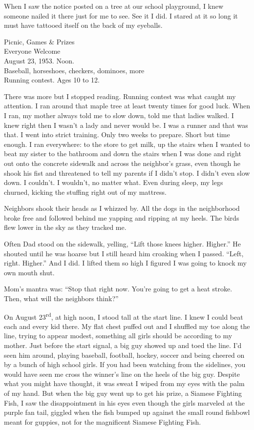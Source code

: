 \documentclass[twoside,10pt]{book}
\begin{document}
When I saw the notice posted on a tree at our school playground, I knew
someone nailed it there just for me to see. See it I did. I stared at it
so long it must have tattooed itself on the back of my eyeballs.

Picnic, Games \& Prizes\\
Everyone Welcome\\
August 23, 1953. Noon.\\
Baseball, horseshoes, checkers, dominoes, more\\
Running contest. Ages 10 to 12.

There was more but I stopped reading. Running contest was what caught my
attention. I ran around that maple tree at least twenty times for good
luck. When I ran, my mother always told me to slow down, told me that
ladies walked. I knew right then I wasn't a lady and never would be. I
was a runner and that was that. I went into strict training. Only two
weeks to prepare. Short but time enough. I ran everywhere: to the store
to get milk, up the stairs when I wanted to beat my sister to the
bathroom and down the stairs when I was done and right out onto the
concrete sidewalk and across the neighbor's grass, even though he shook
his fist and threatened to tell my parents if I didn't stop. I didn't
even slow down. I couldn't. I wouldn't, no matter what. Even during
sleep, my legs churned, kicking the stuffing right out of my mattress.

Neighbors shook their heads as I whizzed by. All the dogs in the
neighborhood broke free and followed behind me yapping and ripping at my
heels. The birds flew lower in the sky as they tracked me.

Often Dad stood on the sidewalk, yelling, ``Lift those knees higher.
Higher.'' He shouted until he was hoarse but I still heard him croaking
when I passed. ``Left, right. Higher.'' And I did. I lifted them so high
I figured I was going to knock my own mouth shut.

Mom's mantra was: ``Stop that right now. You're going to get a heat
stroke. Then, what will the neighbors think?''

On August 23\textsuperscript{rd}, at high noon, I stood tall at the
start line. I knew I could beat each and every kid there. My flat chest
puffed out and I shuffled my toe along the line, trying to appear
modest, some­thing all girls should be according to my mother. Just
before the start signal, a big guy showed up and toed the line. I'd seen
him around, playing baseball, football, hockey, soccer and being cheered
on by a bunch of high school girls. If you had been watching from the
sidelines, you would have seen me cross the winner's line on the heels
of the big guy. Despite what you might have thought, it was sweat I
wiped from my eyes with the palm of my hand. But when the big guy went
up to get his prize, a Siamese Fighting Fish, I saw the disappointment
in his eyes even though the girls marveled at the pur­ple fan tail,
giggled when the fish bumped up against the small round fishbowl meant
for guppies, not for the magnificent Siamese Fighting Fish.
\end{document}

